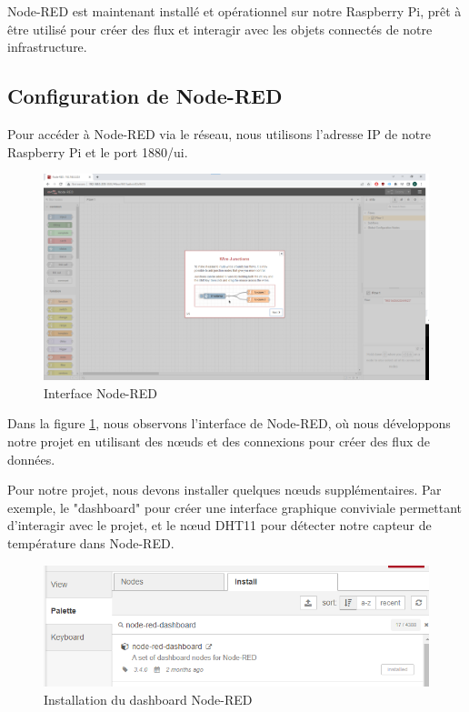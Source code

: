 Node-RED est maintenant installé et opérationnel sur notre Raspberry Pi, prêt à être utilisé pour créer des flux et interagir avec les objets connectés de notre infrastructure.


\subsection{Configuration de Node-RED}

Pour accéder à Node-RED via le réseau, nous utilisons l'adresse IP de notre Raspberry Pi et le port 1880/ui.

\begin{figure}[H]
\centering
\includegraphics[width=15cm]{Images/NodeRedInterface.png}
\caption{Interface Node-RED}
\label{Chap4.3.6}
\end{figure}

Dans la figure \ref{Chap4.3.6}, nous observons l'interface de Node-RED, où nous développons notre projet en utilisant des nœuds et des connexions pour créer des flux de données.

Pour notre projet, nous devons installer quelques nœuds supplémentaires. Par exemple, le "dashboard" pour créer une interface graphique conviviale permettant d'interagir avec le projet, et le nœud DHT11 pour détecter notre capteur de température dans Node-RED.

\begin{figure}[H]
\centering
\includegraphics[width=15cm]{Images/Node-Red-Dashboard-Installed.png}
\caption{Installation du dashboard Node-RED}
\label{Chap4.3.7}
\end{figure}


